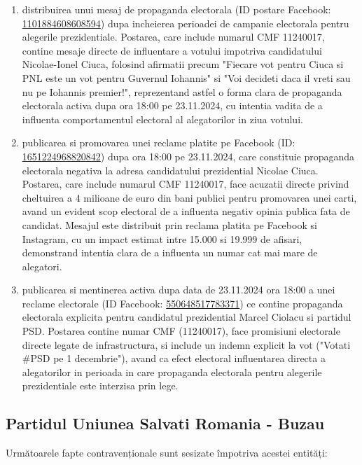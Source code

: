 \documentclass[a4paper,12pt]{article}
\begin{document}
\begin{enumerate}[leftmargin=*, label=\arabic*.)]
    \item distribuirea unui mesaj de propaganda electorala (ID postare Facebook: \href{https://www.facebook.com/ads/library/?id=1101884608608594}{1101884608608594}) dupa incheierea perioadei de campanie electorala pentru alegerile prezidentiale. Postarea, care include numarul CMF 11240017, contine mesaje directe de influentare a votului impotriva candidatului Nicolae-Ionel Ciuca, folosind afirmatii precum "Fiecare vot pentru Ciuca si PNL este un vot pentru Guvernul Iohannis" si "Voi decideti daca il vreti sau nu pe Iohannis premier!", reprezentand astfel o forma clara de propaganda electorala activa dupa ora 18:00 pe 23.11.2024, cu intentia vadita de a influenta comportamentul electoral al alegatorilor in ziua votului.
    \item publicarea si promovarea unei reclame platite pe Facebook (ID: \href{https://www.facebook.com/ads/library/?id=1651224968820842}{1651224968820842}) dupa ora 18:00 pe 23.11.2024, care constituie propaganda electorala negativa la adresa candidatului prezidential Nicolae Ciuca. Postarea, care include numarul CMF 11240017, face acuzatii directe privind cheltuirea a 4 milioane de euro din bani publici pentru promovarea unei carti, avand un evident scop electoral de a influenta negativ opinia publica fata de candidat. Mesajul este distribuit prin reclama platita pe Facebook si Instagram, cu un impact estimat intre 15.000 si 19.999 de afisari, demonstrand intentia clara de a influenta un numar cat mai mare de alegatori.
    \item publicarea si mentinerea activa dupa data de 23.11.2024 ora 18:00 a unei reclame electorale (ID Facebook: \href{https://www.facebook.com/ads/library/?id=550648517783371}{550648517783371}) ce contine propaganda electorala explicita pentru candidatul prezidential Marcel Ciolacu si partidul PSD. Postarea contine numar CMF (11240017), face promisiuni electorale directe legate de infrastructura, si include un indemn explicit la vot ("Votati \#PSD pe 1 decembrie"), avand ca efect electoral influentarea directa a alegatorilor in perioada in care propaganda electorala pentru alegerile prezidentiale este interzisa prin lege.
\end{enumerate}

\vspace{0.5cm}

\subsection{Partidul Uniunea Salvati Romania - Buzau}
Următoarele fapte contravenționale sunt sesizate împotriva acestei entități:
\end{document}
